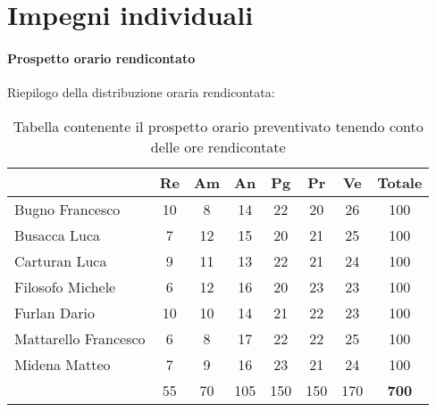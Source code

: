\section{Impegni individuali} \label{section:impegni_individuali}

\paragraph{Prospetto orario rendicontato}
Riepilogo della distribuzione oraria rendicontata:

\begin{table}[H]
  \centering
  \renewcommand{\arraystretch}{1.8}
  \begin{tabular}{l|cccccc|c}
    \rowcolor[HTML]{125E28} 
    \multicolumn{1}{c}{\color[HTML]{FFFFFF}\textbf{Nome}} 
    & \color[HTML]{FFFFFF}\textbf{Re} 
    & \color[HTML]{FFFFFF}\textbf{Am} 
    & \color[HTML]{FFFFFF}\textbf{An} 
    & \color[HTML]{FFFFFF}\textbf{Pg} 
    & \color[HTML]{FFFFFF}\textbf{Pr} 
    & \color[HTML]{FFFFFF}\textbf{Ve} 
    & \color[HTML]{FFFFFF}\textbf{Totale} \\
    \hline
    Bugno Francesco         & 10  & 8   & 14  & 22  & 20  & 26  & 100 \\
    Busacca Luca            & 7   & 12  & 15  & 20  & 21  & 25  & 100 \\
    Carturan Luca           & 9   & 11  & 13  & 22  & 21  & 24  & 100 \\
    Filosofo Michele        & 6   & 12  & 16  & 20  & 23  & 23  & 100 \\
    Furlan Dario 						& 10  & 10	& 14  & 21 	& 22	& 23 	& 100 \\
    Mattarello Francesco    & 6   & 8   & 17  & 22  & 22  & 25  & 100 \\
    Midena Matteo           & 7   & 9   & 16  & 23  & 21  & 24  & 100 \\
    \hline
    \rowcolor[HTML]{125E28}
    \multicolumn{1}{c}{\color[HTML]{FFFFFF}\textbf{Totale}} 
    & \color[HTML]{FFFFFF}55
    & \color[HTML]{FFFFFF}70
    & \color[HTML]{FFFFFF}105
    & \color[HTML]{FFFFFF}150
    & \color[HTML]{FFFFFF}150
    & \color[HTML]{FFFFFF}170
    & \color[HTML]{FFFFFF}\textbf{700}              
  \end{tabular}
  \caption{Tabella contenente il prospetto orario preventivato tenendo conto delle ore rendicontate}
\end{table}
